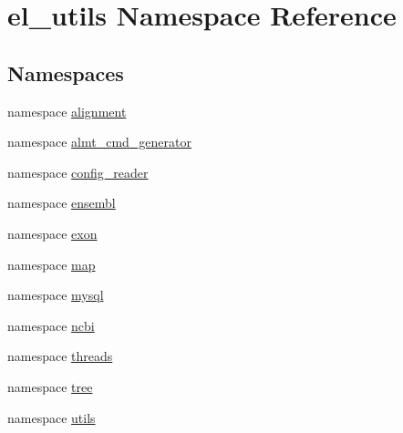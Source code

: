 \hypertarget{namespaceel__utils}{\section{el\-\_\-utils Namespace Reference}
\label{namespaceel__utils}
}
\subsection*{Namespaces}
\begin{DoxyCompactItemize}
\item 
namespace \hyperlink{namespaceel__utils_1_1alignment}{alignment}
\item 
namespace \hyperlink{namespaceel__utils_1_1almt__cmd__generator}{almt\-\_\-cmd\-\_\-generator}
\item 
namespace \hyperlink{namespaceel__utils_1_1config__reader}{config\-\_\-reader}
\item 
namespace \hyperlink{namespaceel__utils_1_1ensembl}{ensembl}
\item 
namespace \hyperlink{namespaceel__utils_1_1exon}{exon}
\item 
namespace \hyperlink{namespaceel__utils_1_1map}{map}
\item 
namespace \hyperlink{namespaceel__utils_1_1mysql}{mysql}
\item 
namespace \hyperlink{namespaceel__utils_1_1ncbi}{ncbi}
\item 
namespace \hyperlink{namespaceel__utils_1_1threads}{threads}
\item 
namespace \hyperlink{namespaceel__utils_1_1tree}{tree}
\item 
namespace \hyperlink{namespaceel__utils_1_1utils}{utils}
\end{DoxyCompactItemize}
